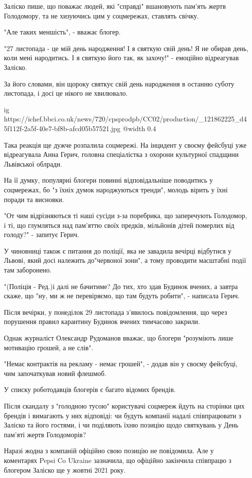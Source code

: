 \begin{multicols}{2}
Заліско пише, що поважає людей, які "справді" вшановують пам'ять жертв
Голодомору, та не хизуючись цим у соцмережах, ставлять свічку.

"Але таких меншість", - вважає блогер.

"27 листопада - це мій день народження! І я святкую свій день! Я не обирав
день, коли мені народитись. І я святкую його так, як захочу!" - емоційно
відреагував Заліско.

За його словами, він щороку святкує свій день народження в останню суботу
листопада, і досі це нікого не хвилювало.


\ifcmt
  ig https://ichef.bbci.co.uk/news/720/cpsprodpb/CC02/production/_121862225_d45f112f-2a5f-40e7-bf8b-afcd05b57521.jpg
  @width 0.4
\fi

Така реакція ще дужче розпалила соцмережі. На інцидент у своєму фейсбуці уже
відреагувала Анна Герич, головна спеціалістка з охорони культурної спадщини
Львівської облради.

На її думку, популярні блогери повинні відповідальніше поводитись у соцмережах,
бо "з їхніх думок народжуються тренди", молодь вірить у їхні поради та
висновки.

"От чим відрізняються ті наші сусіди з-за поребрика, що заперечують Голодомор,
і ті, що глумляться над пам'яттю своїх предків, мільйонів дітей померлих від
голоду?" - запитує Герич.

У чиновниці також є питання до поліції, яка не завадила вечірці відбутися у
Львові, який досі належить до"червоної зони", а тому проводити масштабні події
там заборонено.

"(Поліція - Ред.)і далі не бачитиме? До тих, хто здав Будинок вчених, а завтра
скаже, що "ну, ми ж не перевіряємо, що там будуть робити", - написала Герич.

Після вечірки, у понеділок 29 листопада з'явилось повідомлення, що через
порушення правил карантину Будинок вчених тимчасово закрили.

Однак журналіст Олександр Рудоманов вважає, що блогери "розуміють лише
мотивацію грошей, а не слів".

"Немає контрактів на рекламу - немає грошей", - додав він у своєму фейсбуці,
чим започаткував новий флешмоб.

У списку роботодавців блогерів є багато відомих брендів.

Після скандалу з "голодною тусою" користувачі соцмереж йдуть на сторінки цих
брендів і вимагають у них відповіді: чи будуть компанії надалі співпрацювати з
Заліско та його гостями, і чи поділяють їхню позицію щодо святкувань у День
пам'яті жертв Голодоморів?

Наразі жодна з компаній офіційно свою позицію не повідомила. Але у коментарях
Pepsi Co Ukraine зазначила, що офіційно закінчила співпрацю з блогером Заліско
ще у жовтні 2021 року.

\end{multicols}

